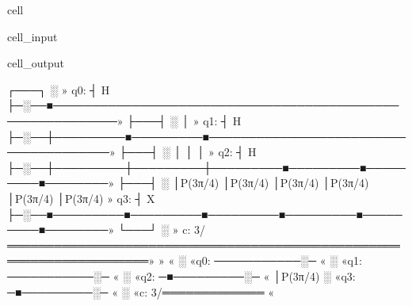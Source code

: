 \documentclass[letterpaper,10pt,english]{jupyterBook}
\begin{document}
\begin{sphinxuseclass}{cell}
\begin{sphinxVerbatimInput}
\begin{sphinxuseclass}{cell_input}
\begin{sphinxVerbatim}[commandchars=\\\{\}]

\end{sphinxVerbatim}

\end{sphinxuseclass}\end{sphinxVerbatimInput}
\begin{sphinxVerbatimOutput}

\begin{sphinxuseclass}{cell_output}
\begin{sphinxVerbatim}[commandchars=\\\{\}]
     ┌───┐ ░                                                             »
q\PYGZus{}0: ┤ H ├─░──■──────────────────────────────────────────────────────────»
     ├───┤ ░  │                                                          »
q\PYGZus{}1: ┤ H ├─░──┼─────────■─────────■──────────────────────────────────────»
     ├───┤ ░  │         │         │                                      »
q\PYGZus{}2: ┤ H ├─░──┼─────────┼─────────┼─────────■─────────■─────────■────────»
     ├───┤ ░  │P(3π/4)  │P(3π/4)  │P(3π/4)  │P(3π/4)  │P(3π/4)  │P(3π/4) »
q\PYGZus{}3: ┤ X ├─░──■─────────■─────────■─────────■─────────■─────────■────────»
     └───┘ ░                                                             »
c: 3/════════════════════════════════════════════════════════════════════»
                                                                         »
«                ░
«q\PYGZus{}0: ───────────░─
«                ░
«q\PYGZus{}1: ───────────░─
«                ░
«q\PYGZus{}2: ─■─────────░─
«      │P(3π/4)  ░
«q\PYGZus{}3: ─■─────────░─
«                ░
«c: 3/═════════════
«
\end{sphinxVerbatim}

\end{sphinxuseclass}\end{sphinxVerbatimOutput}

\end{sphinxuseclass}
\end{document}
